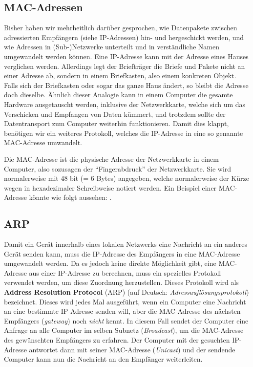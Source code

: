 \subsection{MAC-Adressen}
Bisher haben wir mehrheitlich darüber gesprochen, wie Datenpakete zwischen adressierten Empfängern (siehe \gls{IP}-Adressen) hin- und hergeschickt werden, und wie Adressen in (Sub-)Netzwerke unterteilt und in verständliche Namen umgewandelt werden können. Eine \gls{IP}-Adresse kann mit der Adresse eines Hauses verglichen werden. Allerdings legt der Briefträger die Briefe und Pakete nicht an einer Adresse ab, sondern in einem Briefkasten, also einem konkreten Objekt. Falls sich der Briefkasten oder sogar das ganze Haus ändert, so bleibt die Adresse doch dieselbe. Ähnlich dieser Analogie kann in einem Computer die gesamte Hardware ausgetauscht werden, inklusive der Netzwerkkarte, welche sich um das Verschicken und Empfangen von Daten kümmert, und trotzdem sollte der Datentransport zum Computer weiterhin funktionieren. Damit dies klappt, benötigen wir ein weiteres Protokoll, welches die \gls{IP}-Adresse in eine so genannte \gls{MAC}-Adresse umwandelt.

\begin{mydefinition}
Die \gls{MAC}-Adresse ist die physische Adresse der Netzwerkkarte in einem Computer, also sozusagen der \enquote{Fingerabdruck} der Netzwerkkarte. Sie wird normalerweise mit 48 bit (= 6 Bytes) angegeben, welche normalerweise der Kürze wegen in hexadezimaler Schreibweise notiert werden. Ein Beispiel einer \gls{MAC}-Adresse könnte wie folgt aussehen: .
\end{mydefinition}

\subsection{\texorpdfstring{\gls{ARP}}{ARP}}
Damit ein Gerät innerhalb eines lokalen Netzwerks eine Nachricht an ein anderes Gerät senden kann, muss die \gls{IP}-Adresse des Empfängers in eine \gls{MAC}-Adresse umgewandelt werden. Da es jedoch keine direkte Möglichkeit gibt, eine \gls{MAC}-Adresse aus einer \gls{IP}-Adresse zu berechnen, muss ein spezielles Protokoll verwendet werden, um diese Zuordnung herzustellen. Dieses Protokoll wird als \textbf{Address Resolution Protocol} (\gls{ARP})  (auf Deutsch: \textit{Adressauflösungsprotokoll})  bezeichnet. Dieses wird jedes Mal ausgeführt, wenn ein Computer eine Nachricht an eine bestimmte \gls{IP}-Adresse senden will, aber die \gls{MAC}-Adresse des nächsten Empfängers (\textit{gateway})  noch  \textit{nicht} kennt. In diesem Fall sendet der Computer eine Anfrage an alle Computer im selben Subnetz (\textit{Broadcast}), um die \gls{MAC}-Adresse des gewünschten Empfängers zu erfahren. Der Computer mit der gesuchten \gls{IP}-Adresse antwortet dann mit seiner \gls{MAC}-Adresse (\textit{Unicast}) und der sendende Computer kann nun die Nachricht an den Empfänger weiterleiten.

